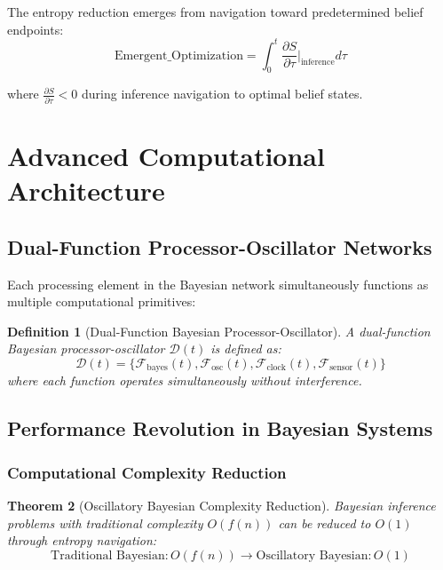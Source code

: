 \documentclass[12pt,a4paper]{article}
\newtheorem{theorem}{Theorem}[section]
\newtheorem{definition}[theorem]{Definition}
\begin{document}
The entropy reduction emerges from navigation toward predetermined belief endpoints:
\begin{equation}
\text{Emergent\_Optimization} = \int_0^t \frac{\partial S}{\partial \tau} \bigg|_{\text{inference}} d\tau
\end{equation}

where $\frac{\partial S}{\partial \tau} < 0$ during inference navigation to optimal belief states.

\section{Advanced Computational Architecture}

\subsection{Dual-Function Processor-Oscillator Networks}

Each processing element in the Bayesian network simultaneously functions as multiple computational primitives:

\begin{definition}[Dual-Function Bayesian Processor-Oscillator]
A dual-function Bayesian processor-oscillator $\mathcal{D}(t)$ is defined as:
\begin{equation}
\mathcal{D}(t) = \{\mathcal{F}_{\text{bayes}}(t), \mathcal{F}_{\text{osc}}(t), \mathcal{F}_{\text{clock}}(t), \mathcal{F}_{\text{sensor}}(t)\}
\end{equation}
where each function operates simultaneously without interference.
\end{definition}

\subsection{Performance Revolution in Bayesian Systems}

\subsubsection{Computational Complexity Reduction}

\begin{theorem}[Oscillatory Bayesian Complexity Reduction]
Bayesian inference problems with traditional complexity $O(f(n))$ can be reduced to $O(1)$ through entropy navigation:
\begin{equation}
\text{Traditional Bayesian}: O(f(n)) \rightarrow \text{Oscillatory Bayesian}: O(1)
\end{equation}
\end{theorem}
\end{document}
